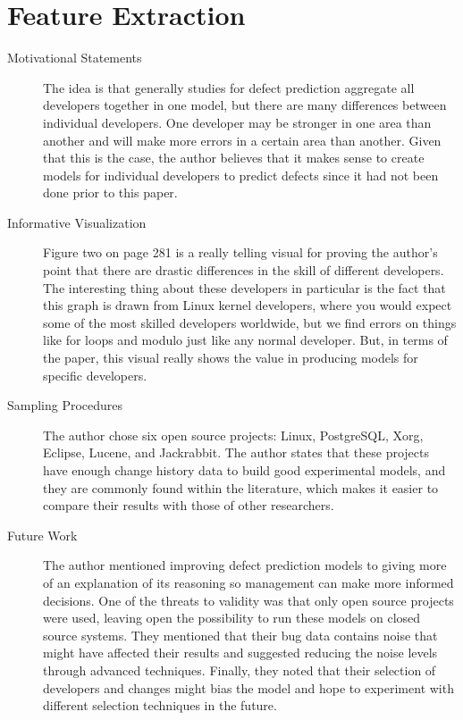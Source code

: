 \documentclass[english]{article}
\begin{document}
\section*{Feature Extraction}
\begin{description}
\item[{Motivational Statements}]  The idea is that generally studies for defect prediction aggregate all developers together in one model, but there are many differences between individual developers.  One developer may be stronger in one area than another and will make more errors in a certain area than another.  Given that this is the case, the author believes that it makes sense to create models for individual developers to predict defects since it had not been done prior to this paper.
\item[{Informative Visualization}]  Figure two on page 281 is a really telling visual for proving the author's point that there are drastic differences in the skill of different developers.  The interesting thing about these developers in particular is the fact that this graph is drawn from Linux kernel developers, where you would expect some of the most skilled developers worldwide, but we find errors on things like for loops and modulo just like any normal developer.  But, in terms of the paper, this visual really shows the value in producing models for specific developers.
\item[{Sampling Procedures}] The author chose six open source projects: Linux, PostgreSQL, Xorg, Eclipse, Lucene, and Jackrabbit. The author states that these projects have enough change history data to build good experimental models, and they are commonly found within the literature, which makes it easier to compare their results with those of other researchers.
\item[{Future Work}] The author mentioned improving defect prediction models to giving more of an explanation of its reasoning so management can make more informed decisions. One of the threats to validity was that only open source projects were used, leaving open the possibility to run these models on closed source systems. They mentioned that their bug data contains noise that might have affected their results and suggested reducing the noise levels through advanced techniques. Finally, they noted that their selection of developers and changes might bias the model and hope to experiment with different selection techniques in the future.
\end{description}
\end{document}
